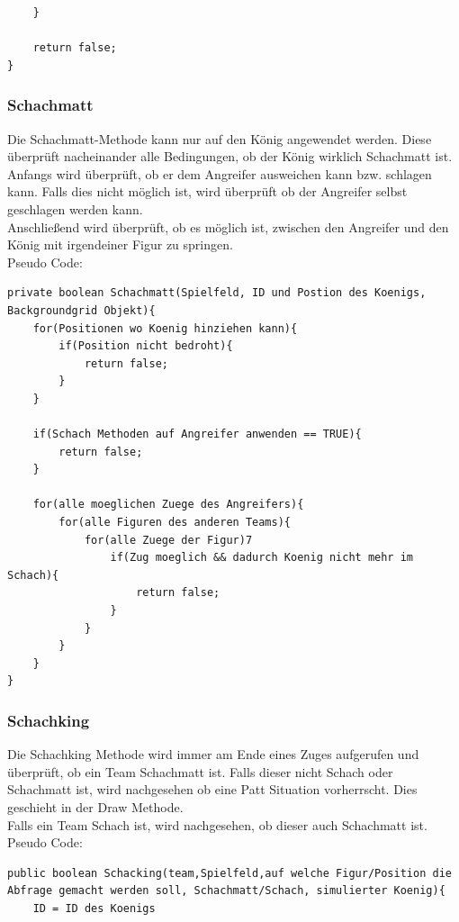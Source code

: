 \documentclass[12pt,a4paper]{article}
\begin{document}
{\begin{lstlisting}
	}
	
	return false;	
}
\end{lstlisting}

\subsubsection{Schachmatt}
\label{SUBSUBSEC:checkmate}

Die Schachmatt-Methode kann nur auf den König angewendet werden. Diese überprüft nacheinander alle Bedingungen, ob der König wirklich Schachmatt ist. Anfangs wird überprüft, ob er dem Angreifer ausweichen kann bzw. schlagen kann. Falls dies nicht möglich ist, wird überprüft ob der Angreifer selbst geschlagen werden kann. \\
Anschließend wird überprüft, ob es möglich ist, zwischen den Angreifer und den König mit irgendeiner Figur zu springen. \\
Pseudo Code:

\lstset{language=Java}
\begin{lstlisting}
private boolean Schachmatt(Spielfeld, ID und Postion des Koenigs, Backgroundgrid Objekt){
	for(Positionen wo Koenig hinziehen kann){
		if(Position nicht bedroht){
			return false;
		}
	}
	
	if(Schach Methoden auf Angreifer anwenden == TRUE){
		return false;
	}
	
	for(alle moeglichen Zuege des Angreifers){
		for(alle Figuren des anderen Teams){
			for(alle Zuege der Figur)7
				if(Zug moeglich && dadurch Koenig nicht mehr im Schach){
					return false;
				}
			}			
		}
	}
}
\end{lstlisting}


\subsubsection{Schachking}
\label{SUBSUBSEC:checkking}

Die Schachking Methode wird immer am Ende eines Zuges aufgerufen und überprüft, ob ein Team Schachmatt ist. Falls dieser nicht Schach oder Schachmatt ist, wird nachgesehen ob eine Patt Situation vorherrscht. Dies geschieht in der Draw Methode. \\
Falls ein Team Schach ist, wird nachgesehen, ob dieser auch Schachmatt ist. \\
Pseudo Code:

\lstset{language=Java}
\begin{lstlisting}
public boolean Schacking(team,Spielfeld,auf welche Figur/Position die Abfrage gemacht werden soll, Schachmatt/Schach, simulierter Koenig){
	ID = ID des Koenigs
	

\end{lstlisting}}
\end{document}
